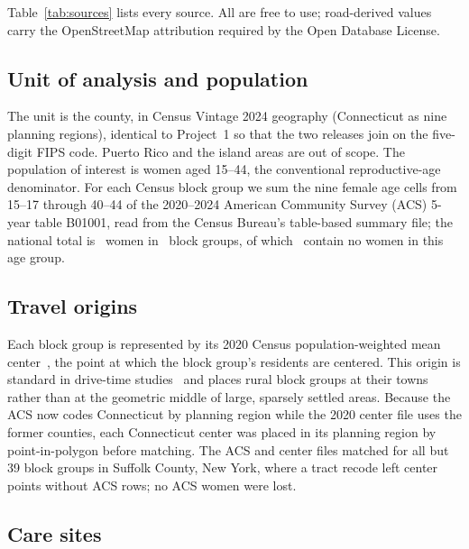 \documentclass[10pt,twocolumn,letterpaper]{article}
\begin{document}
Table~\ref{tab:sources} lists every source. All are free to use; road-derived values carry the OpenStreetMap attribution required by the Open Database License.

\begin{table}[t]
\centering\footnotesize
\caption{Data sources, vintages, and their role in the study. All sources are openly licensed or U.S.\ public domain.}\label{tab:sources}

\end{table}

\subsection{Unit of analysis and population}
The unit is the county, in Census Vintage 2024 geography (Connecticut as nine planning regions), identical to Project~1 so that the two releases join on the five-digit FIPS code. Puerto Rico and the island areas are out of scope. The population of interest is women aged 15--44, the conventional reproductive-age denominator. For each Census block group we sum the nine female age cells from 15--17 through 40--44 of the 2020--2024 American Community Survey (ACS) 5-year table B01001, read from the Census Bureau's table-based summary file; the national total is \Women\ women in \NBG\ block groups, of which \NBGZero\ contain no women in this age group.

\subsection{Travel origins}
Each block group is represented by its 2020 Census population-weighted mean center~\cite{cenpop}, the point at which the block group's residents are centered. This origin is standard in drive-time studies~\cite{rayburn2012} and places rural block groups at their towns rather than at the geometric middle of large, sparsely settled areas. Because the ACS now codes Connecticut by planning region while the 2020 center file uses the former counties, each Connecticut center was placed in its planning region by point-in-polygon before matching. The ACS and center files matched for all but 39 block groups in Suffolk County, New York, where a tract recode left center points without ACS rows; no ACS women were lost.

\subsection{Care sites}
\end{document}
